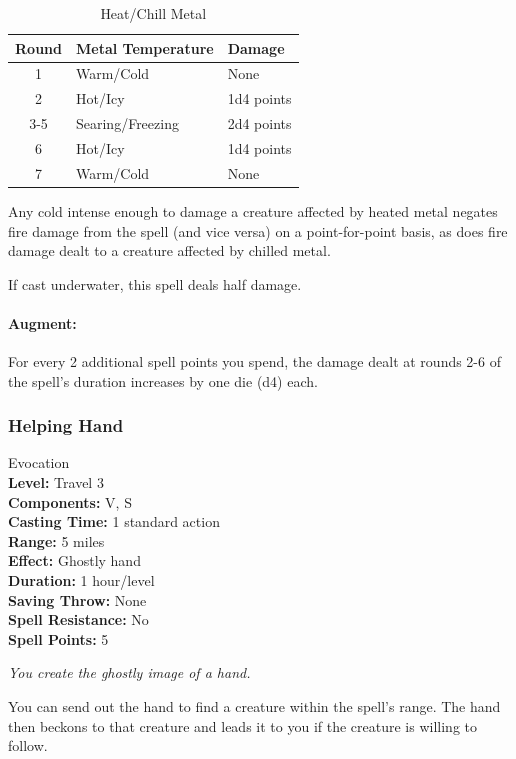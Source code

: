 \begin{table}
\label{tab:HeatChillMetal}
\caption{Heat/Chill Metal}
\begin{center}
\begin{tabular}{|c|l|l|}
\hline
Round&Metal Temperature&Damage\\
\hline
1&Warm/Cold&None\\
2&Hot/Icy&1d4 points\\
3-5&Searing/Freezing&2d4 points\\
6&Hot/Icy&1d4 points\\
7&Warm/Cold&None\\
\hline
\end{tabular}
\end{center}
\end{table}

Any cold intense enough to damage a creature affected by heated metal negates fire damage from the spell (and vice versa) on a point-for-point basis, as does fire damage dealt to a creature affected by chilled metal.

If cast underwater, this spell deals half damage.

\paragraph{Augment:} For every 2 additional spell points you spend, the damage dealt at rounds 2-6 of the spell's duration increases by one die (d4) each.
\subsubsection{Helping Hand}
\label{Spell:HelpingHand}
Evocation
\\ \textbf{Level:} Travel 3
\\ \textbf{Components:} V, S
\\ \textbf{Casting Time:} 1 standard action
\\ \textbf{Range:} 5 miles
\\ \textbf{Effect:} Ghostly hand
\\ \textbf{Duration:} 1 hour/level
\\ \textbf{Saving Throw:} None
\\ \textbf{Spell Resistance:} No
\\ \textbf{Spell Points:} 5

\emph{You create the ghostly image of a hand.}

You can send out the hand to find a creature within the spell's range. 
The hand then beckons to that creature and leads it to you if the creature is willing to follow.

